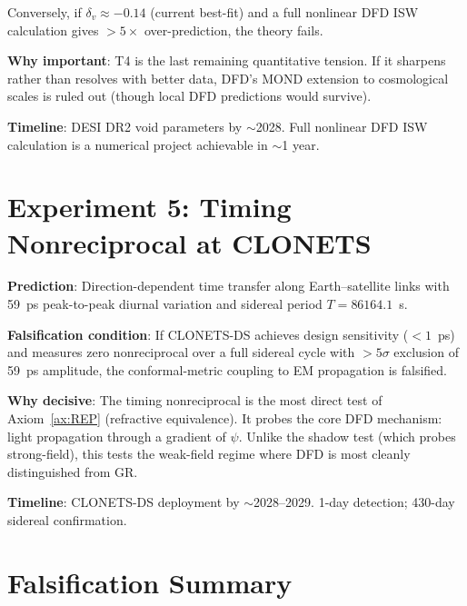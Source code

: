 \documentclass[11pt]{article}
\begin{document}
Conversely, if $\delta_v \approx -0.14$ (current best-fit) and a
full nonlinear DFD ISW calculation gives $>5\times$ over-prediction,
the theory fails.

\textbf{Why important}: T4 is the last remaining quantitative tension.
If it sharpens rather than resolves with better data, DFD's MOND
extension to cosmological scales is ruled out (though local DFD
predictions would survive).

\textbf{Timeline}: DESI DR2 void parameters by $\sim$2028.
Full nonlinear DFD ISW calculation is a numerical project
achievable in $\sim$1 year.


\section{Experiment 5: Timing Nonreciprocal at CLONETS}
\label{sec:falsify-NR}

\textbf{Prediction}: Direction-dependent time transfer along
Earth--satellite links with 59~ps peak-to-peak diurnal variation and
sidereal period $T = 86164.1$~s.

\textbf{Falsification condition}: If CLONETS-DS achieves design
sensitivity ($<1$~ps) and measures zero nonreciprocal over a full
sidereal cycle with $>5\sigma$ exclusion of 59~ps amplitude, the
conformal-metric coupling to EM propagation is falsified.

\textbf{Why decisive}: The timing nonreciprocal is the most direct
test of Axiom~\ref{ax:REP} (refractive equivalence). It probes the
core DFD mechanism: light propagation through a gradient of $\psi$.
Unlike the shadow test (which probes strong-field), this tests the
weak-field regime where DFD is most cleanly distinguished from GR.

\textbf{Timeline}: CLONETS-DS deployment by $\sim$2028--2029.
1-day detection; 430-day sidereal confirmation.


\section{Falsification Summary}
\label{sec:falsify-summary}
\end{document}
